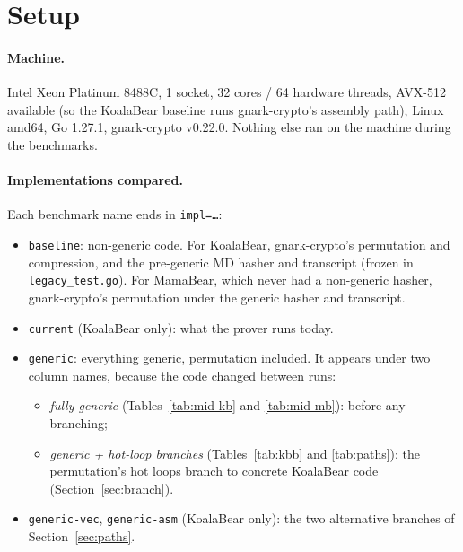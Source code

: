 \documentclass[10pt,a4paper]{article}
\begin{document}
\section{Setup}

\paragraph{Machine.} Intel Xeon Platinum 8488C, 1 socket, 32 cores / 64 hardware threads, AVX-512 available (so the KoalaBear
baseline runs gnark-crypto's assembly path), Linux amd64, Go 1.27.1, gnark-crypto v0.22.0.
Nothing else ran on the machine during the benchmarks.

\paragraph{Implementations compared.} Each benchmark name ends in \texttt{impl=\dots}:
\begin{itemize}
  \item \texttt{baseline}: non-generic code. For KoalaBear, gnark-crypto's permutation and
    compression, and the pre-generic MD hasher and transcript (frozen in
    \texttt{legacy\_test.go}). For MamaBear, which never had a non-generic hasher,
    gnark-crypto's permutation under the generic hasher and transcript.
  \item \texttt{current} (KoalaBear only): what the prover runs today.
  \item \texttt{generic}: everything generic, permutation included. It appears under two
    column names, because the code changed between runs:
    \begin{itemize}
      \item \emph{fully generic} (Tables~\ref{tab:mid-kb} and \ref{tab:mid-mb}): before
        any branching;
      \item \emph{generic + hot-loop branches} (Tables~\ref{tab:kbb} and \ref{tab:paths}):
        the permutation's hot loops branch to concrete KoalaBear code
        (Section~\ref{sec:branch}).
    \end{itemize}
  \item \texttt{generic-vec}, \texttt{generic-asm} (KoalaBear only): the two alternative
    branches of Section~\ref{sec:paths}.
\end{itemize}
\end{document}
